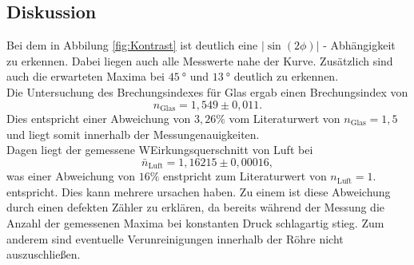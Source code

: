 \subsection{Diskussion}
Bei dem in Abbilung \ref{fig:Kontrast} ist deutlich eine $|\sin{(2\phi)}|$ - Abhängigkeit zu erkennen. Dabei liegen auch alle Messwerte nahe der Kurve. Zusätzlich sind auch die erwarteten Maxima bei $\SI{45}{\degree}$ und $\SI{13}{\degree}$ deutlich zu erkennen. \\
Die Untersuchung des Brechungsindexes für Glas ergab einen Brechungsindex von 
\begin{equation}
    n_\text{Glas} = 1,549 \pm 0,011 .
\end{equation}
Dies entspricht einer Abweichung von $3,26 \%$ vom Literaturwert von $n_\text{Glas} = 1,5$ und liegt somit innerhalb der Messungenauigkeiten.  \\
Dagen liegt der gemessene WEirkungsquerschnitt von Luft bei 
\begin{equation}
    \bar{n}_\text{Luft} = 1,16215 \pm 0,00016 ,
 \end{equation}
was einer Abweichung von $16 \%$ enstpricht zum Literaturwert von $n_\text{Luft} = 1$. entspricht. Dies kann mehrere ursachen haben. Zu einem ist diese Abweichung durch einen defekten Zähler zu erklären, da bereits während der Messung die Anzahl der gemessenen Maxima bei konstanten Druck schlagartig stieg. Zum anderem sind eventuelle Verunreinigungen innerhalb der Röhre nicht auszuschließen.    